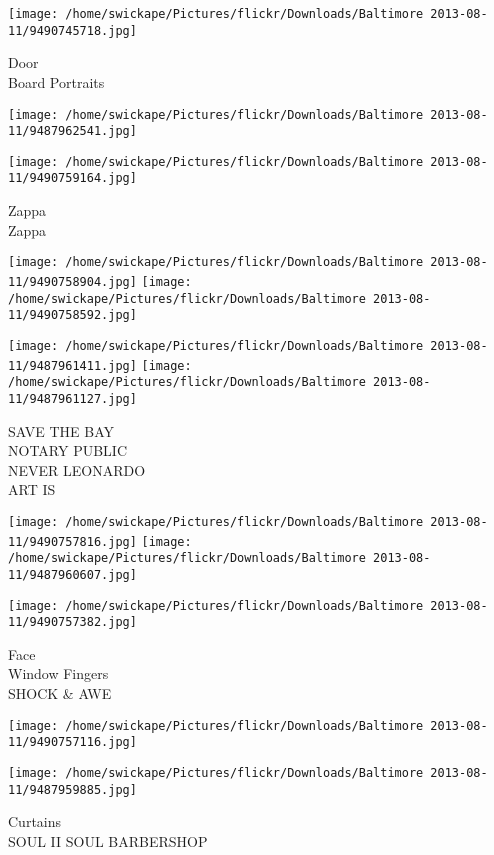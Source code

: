 \documentclass[10pt,letterpaper]{article}
\begin{document}
\vspace{0.25in}
\texttt{[image: /home/swickape/Pictures/flickr/Downloads/Baltimore 2013-08-11/9490745718.jpg]}

Door\\
Board Portraits
\pagebreak

\texttt{[image: /home/swickape/Pictures/flickr/Downloads/Baltimore 2013-08-11/9487962541.jpg]}

\vspace{0.25in}
\texttt{[image: /home/swickape/Pictures/flickr/Downloads/Baltimore 2013-08-11/9490759164.jpg]}

Zappa\\
Zappa
\pagebreak

\texttt{[image: /home/swickape/Pictures/flickr/Downloads/Baltimore 2013-08-11/9490758904.jpg]}
\texttt{[image: /home/swickape/Pictures/flickr/Downloads/Baltimore 2013-08-11/9490758592.jpg]}

\texttt{[image: /home/swickape/Pictures/flickr/Downloads/Baltimore 2013-08-11/9487961411.jpg]}
\texttt{[image: /home/swickape/Pictures/flickr/Downloads/Baltimore 2013-08-11/9487961127.jpg]}

SAVE THE BAY\\
NOTARY PUBLIC\\
NEVER LEONARDO\\
ART IS
\pagebreak

\texttt{[image: /home/swickape/Pictures/flickr/Downloads/Baltimore 2013-08-11/9490757816.jpg]}
\texttt{[image: /home/swickape/Pictures/flickr/Downloads/Baltimore 2013-08-11/9487960607.jpg]}

\texttt{[image: /home/swickape/Pictures/flickr/Downloads/Baltimore 2013-08-11/9490757382.jpg]}

Face\\
Window Fingers\\
SHOCK \& AWE
\pagebreak

\texttt{[image: /home/swickape/Pictures/flickr/Downloads/Baltimore 2013-08-11/9490757116.jpg]}

\vspace{0.25in}
\texttt{[image: /home/swickape/Pictures/flickr/Downloads/Baltimore 2013-08-11/9487959885.jpg]}

Curtains\\
SOUL II SOUL BARBERSHOP
\pagebreak
\end{document}
